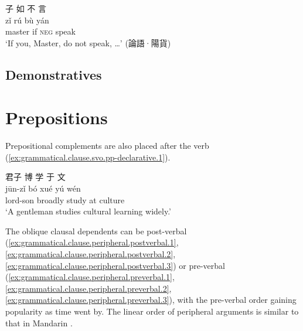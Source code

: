 \documentclass[UTF8, a4paper, oneside, scheme=plain, 12pt]{ctexrep}
\newcommand*{\citepages}[1]{pp.~{#1}}
\newcommand{\translate}[1]{`#1'}
\newcommand*{\category}[1]{\textsc{#1}}
\begin{document}
\begin{exe}
    \ex\label{ex:pronoun.idiom.didactic.disciple-to-master.1}
    \glll 子 如 不 言 \\
    zǐ rú bù yán \\
    master if \category{neg} speak \\
    \glt\translate{If you, Master, do not speak, \dots} \hfill (論語·陽貨)
\end{exe}

\section{Demonstratives}


\chapter{Prepositions}

Prepositional complements are also placed after the verb
(\ref{ex:grammatical.clause.svo.pp-declarative.1}).

\begin{exe}
    \ex\label{ex:grammatical.clause.svo.pp-declarative.1}
    \glll 君子 博 学 于 文 \\
    jūn-zǐ bó xué yú wén \\
    lord-son broadly study at culture \\
    \glt\translate{A gentleman studies cultural learning widely.}
\end{exe}

The oblique clausal dependents can be post-verbal
(\ref{ex:grammatical.clause.peripheral.postverbal.1},
\ref{ex:grammatical.clause.peripheral.postverbal.2},
\ref{ex:grammatical.clause.peripheral.postverbal.3})
or pre-verbal
(\ref{ex:grammatical.clause.peripheral.preverbal.1},
\ref{ex:grammatical.clause.peripheral.preverbal.2},
\ref{ex:grammatical.clause.peripheral.preverbal.3}),
with the pre-verbal order gaining popularity as time went by.
The linear order of peripheral arguments is similar to that in Mandarin
\citep[\citepages{286-287}]{he2005shiji}.
\end{document}
